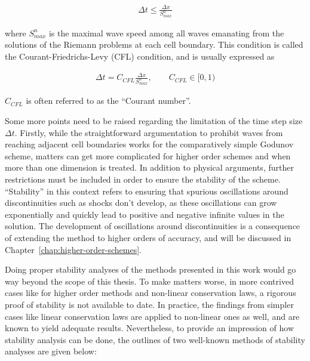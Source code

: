 \begin{align}
 \Delta t \leq \frac{\Delta x}{S_{max}^n}
\end{align}

where $S_{max}^n$ is the maximal wave speed among all waves emanating from the solutions of the
Riemann problems at each cell boundary. This condition is called the Courant-Friedrichs-Levy (CFL)
condition, and is usually expressed as

\begin{align}
 \Delta t = C_{CFL} \frac{\Delta x}{S_{max}^n}, \quad\quad C_{CFL} \in [0, 1) \label{eq:godunov-cfl}
\end{align}

$C_{CFL}$ is often referred to as the ``Courant number''.

Some more points need to be raised regarding the limitation of the time step size $\Delta t$.
Firstly, while the straightforward argumentation to prohibit waves from reaching adjacent cell
boundaries works for the comparatively simple Godunov scheme, matters can get more complicated for
higher order schemes and when more than one dimension is treated. In addition to physical
arguments, further restrictions must be included in order to ensure the stability of the scheme.
``Stability'' in this context refers to ensuring that spurious oscillations around discontinuities
such as shocks don't develop, as these oscillations can grow exponentially and quickly lead to
positive and negative infinite values in the solution. The development of oscillations around
discontinuities is a consequence of extending the method to higher orders of accuracy, and will be
discussed in Chapter~\ref{chap:higher-order-schemes}.

Doing proper stability analyses of the methods presented in this work would go way beyond the
scope of this thesis. To make matters worse, in more contrived cases like for higher order methods
and non-linear conservation laws, a rigorous proof of stability is not available to date. In
practice, the findings from simpler cases like linear conservation laws are applied to non-linear
ones as well, and are known to yield adequate results. Nevertheless, to provide an impression of how
stability analysis can be done, the outlines of two well-known methods of stability analyses are
given below:


